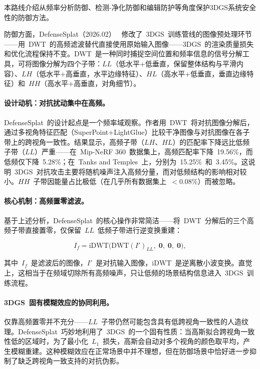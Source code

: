 本路线介绍从频率分析防御、检测-净化防御和编辑防护等角度保护3DGS系统安全性的防御方法。

防御方面，DefenseSplat（2026.02）~\cite{2602_19323} 修改了~3DGS~训练管线的图像预处理环节——用~DWT~的高频滤波替代直接使用原始输入图像——3DGS~的渲染质量损失和优化流程保持不变。DWT~是一种同时捕捉空间位置和频率信息的信号分解工具，可将图像分解为四个子带：$LL$（低水平+低垂直，保留整体结构与平滑内容）、$LH$（低水平+高垂直，水平边缘特征）、$HL$（高水平+低垂直，垂直边缘特征）和~$HH$（高水平+高垂直，对角细节）。

\paragraph{设计动机：对抗扰动集中在高频。}
DefenseSplat~的设计起点是一个频率域观察。作者用~DWT~将对抗图像分解后，通过多视角特征匹配（SuperPoint+LightGlue）比较干净图像与对抗图像在各子带上的跨视角一致性。结果显示，高频子带（$LH$、$HL$）的匹配率下降远比低频子带（$LL$）严重——在~Mip-NeRF 360~数据集上，高频匹配率下降~19.56\%，而低频仅下降~5.28\%；在~Tanks and Temples~上，分别为~15.25\%~和~3.45\%。这说明~3DGS~对抗攻击主要将随机噪声注入高频分量，而对低频结构的影响相对较小。$HH$~子带因能量占比极低（在几乎所有数据集上~$<$0.08\%）而被忽略。

\paragraph{核心机制：高频置零滤波。}
基于上述分析，DefenseSplat~的核心操作非常简洁——将~DWT~分解后的三个高频子带直接置零，仅保留~$LL$~低频子带进行逆变换重建：

\begin{equation}
I_f = \mathrm{iDWT}\bigl(\mathrm{DWT}(I')_{LL},\; \mathbf{0},\; \mathbf{0},\; \mathbf{0}\bigr),
\end{equation}

其中~$I_f$~是滤波后的图像，$I'$~是对抗输入图像，$\mathrm{iDWT}$~是逆离散小波变换。直觉上，这相当于在频域切除所有高频噪声，只让低频的场景结构信息进入~3DGS~训练流程。

\paragraph{3DGS~固有模糊效应的协同利用。}
仅靠高频置零并不充分——$LL$~子带仍然可能包含具有低跨视角一致性的人造纹理。DefenseSplat~巧妙地利用了~3DGS~的一个固有性质：当高斯拟合跨视角一致性低的区域时，为了最小化~$L_1$~损失，高斯会自动对多个视角的颜色取平均，产生模糊重建。这种模糊效应在正常场景中并不理想，但在防御场景中恰好进一步抑制了缺乏跨视角一致支持的对抗伪影。

